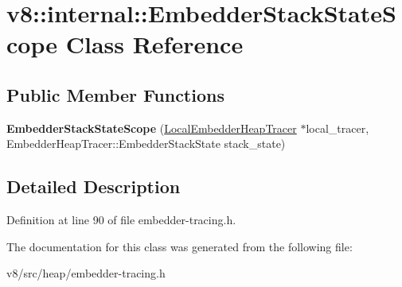 \hypertarget{classv8_1_1internal_1_1EmbedderStackStateScope}{}\section{v8\+:\+:internal\+:\+:Embedder\+Stack\+State\+Scope Class Reference}
\label{classv8_1_1internal_1_1EmbedderStackStateScope}
\subsection*{Public Member Functions}
\begin{DoxyCompactItemize}
\item 
\mbox{\label{classv8_1_1internal_1_1EmbedderStackStateScope_a6a3399087bc24fe8da5b36f4015b8686}} 
{\bfseries Embedder\+Stack\+State\+Scope} (\mbox{\hyperlink{classv8_1_1internal_1_1LocalEmbedderHeapTracer}{Local\+Embedder\+Heap\+Tracer}} $\ast$local\+\_\+tracer, Embedder\+Heap\+Tracer\+::\+Embedder\+Stack\+State stack\+\_\+state)
\end{DoxyCompactItemize}


\subsection{Detailed Description}


Definition at line 90 of file embedder-\/tracing.\+h.



The documentation for this class was generated from the following file\+:\begin{DoxyCompactItemize}
\item 
v8/src/heap/embedder-\/tracing.\+h\end{DoxyCompactItemize}
